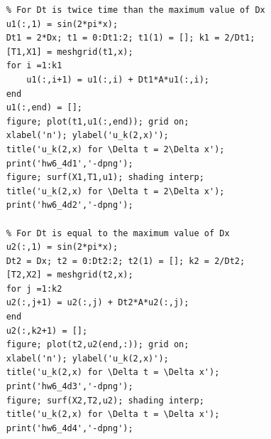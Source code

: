 \documentclass[14pt,a4paper]{article}
\begin{document}
\begin{enumerate}
\begin{lstlisting}
	% For Dt is twice time than the maximum value of Dx
	u1(:,1) = sin(2*pi*x); 
	Dt1 = 2*Dx; t1 = 0:Dt1:2; t1(1) = []; k1 = 2/Dt1;
	[T1,X1] = meshgrid(t1,x);
	for i =1:k1
		u1(:,i+1) = u1(:,i) + Dt1*A*u1(:,i);
	end
	u1(:,end) = [];
	figure; plot(t1,u1(:,end)); grid on;
	xlabel('n'); ylabel('u_k(2,x)');
	title('u_k(2,x) for \Delta t = 2\Delta x');
	print('hw6_4d1','-dpng');
	figure; surf(X1,T1,u1); shading interp;
	title('u_k(2,x) for \Delta t = 2\Delta x');
	print('hw6_4d2','-dpng');
	
	% For Dt is equal to the maximum value of Dx
	u2(:,1) = sin(2*pi*x);
	Dt2 = Dx; t2 = 0:Dt2:2; t2(1) = []; k2 = 2/Dt2;
	[T2,X2] = meshgrid(t2,x);
	for j =1:k2
	u2(:,j+1) = u2(:,j) + Dt2*A*u2(:,j);
	end
	u2(:,k2+1) = [];
	figure; plot(t2,u2(end,:)); grid on;
	xlabel('n'); ylabel('u_k(2,x)');
	title('u_k(2,x) for \Delta t = \Delta x');
	print('hw6_4d3','-dpng');
	figure; surf(X2,T2,u2); shading interp;
	title('u_k(2,x) for \Delta t = \Delta x');
	print('hw6_4d4','-dpng');
	
	\end{lstlisting}
\end{enumerate}
	
	
\end{document}
